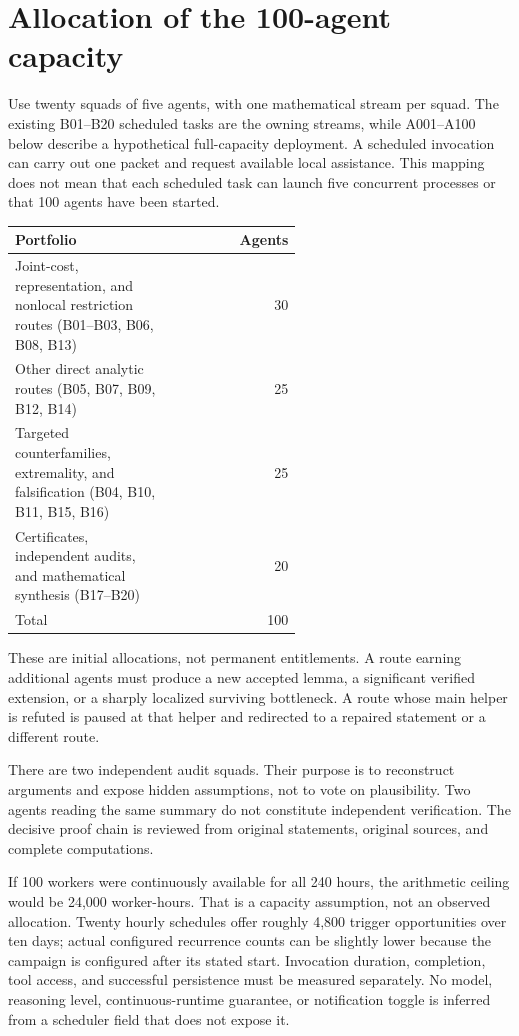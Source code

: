 \documentclass[11pt]{article}
\begin{document}
\section{Allocation of the 100-agent capacity}

Use twenty squads of five agents, with one mathematical stream per squad. The existing B01--B20 scheduled tasks are the owning streams, while A001--A100 below describe a hypothetical full-capacity deployment. A scheduled invocation can carry out one packet and request available local assistance. This mapping does not mean that each scheduled task can launch five concurrent processes or that 100 agents have been started.

\begin{center}
\begin{tabular}{p{0.57\linewidth}r}
\toprule
Portfolio & Agents \\
\midrule
Joint-cost, representation, and nonlocal restriction routes (B01--B03, B06, B08, B13) & 30 \\
Other direct analytic routes (B05, B07, B09, B12, B14) & 25 \\
Targeted counterfamilies, extremality, and falsification (B04, B10, B11, B15, B16) & 25 \\
Certificates, independent audits, and mathematical synthesis (B17--B20) & 20 \\
\midrule
Total & 100 \\
\bottomrule
\end{tabular}
\end{center}

These are initial allocations, not permanent entitlements. A route earning additional agents must produce a new accepted lemma, a significant verified extension, or a sharply localized surviving bottleneck. A route whose main helper is refuted is paused at that helper and redirected to a repaired statement or a different route.

There are two independent audit squads. Their purpose is to reconstruct arguments and expose hidden assumptions, not to vote on plausibility. Two agents reading the same summary do not constitute independent verification. The decisive proof chain is reviewed from original statements, original sources, and complete computations.

If 100 workers were continuously available for all 240 hours, the arithmetic ceiling would be 24,000 worker-hours. That is a capacity assumption, not an observed allocation. Twenty hourly schedules offer roughly 4,800 trigger opportunities over ten days; actual configured recurrence counts can be slightly lower because the campaign is configured after its stated start. Invocation duration, completion, tool access, and successful persistence must be measured separately. No model, reasoning level, continuous-runtime guarantee, or notification toggle is inferred from a scheduler field that does not expose it.
\end{document}
